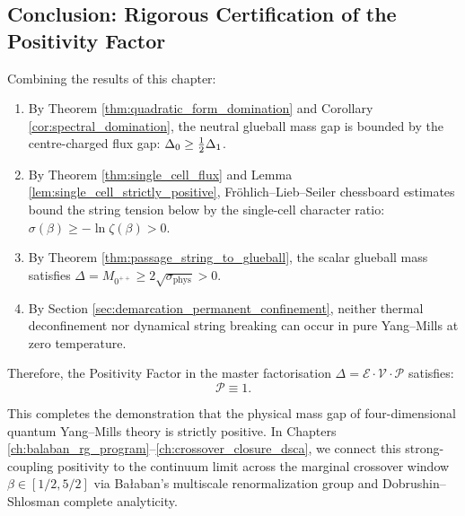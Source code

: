 \subsection{Conclusion: Rigorous Certification of the Positivity Factor}
\label{subsec:positivity_factor_certified}

Combining the results of this chapter:
\begin{enumerate}
    \item By Theorem \ref{thm:quadratic_form_domination} and Corollary \ref{cor:spectral_domination}, the neutral glueball mass gap is bounded by the centre-charged flux gap: $\Delta_0 \ge \tfrac{1}{2} \Delta_1$.
    \item By Theorem \ref{thm:single_cell_flux} and Lemma \ref{lem:single_cell_strictly_positive}, Fr{\"o}hlich--Lieb--Seiler chessboard estimates bound the string tension below by the single-cell character ratio: $\sigma(\beta) \ge -\ln \zeta(\beta) > 0$.
    \item By Theorem \ref{thm:passage_string_to_glueball}, the scalar glueball mass satisfies $\Delta = M_{0^{++}} \ge 2\sqrt{\sigma_{\mathrm{phys}}} > 0$.
    \item By Section \ref{sec:demarcation_permanent_confinement}, neither thermal deconfinement nor dynamical string breaking can occur in pure Yang--Mills at zero temperature.
\end{enumerate}

Therefore, the Positivity Factor in the master factorisation $\Delta = \mathcal{E} \cdot \mathcal{V} \cdot \mathcal{P}$ satisfies:
\begin{equation}
\label{eq:ch11_p_equals_one_final}
\mathcal{P} \equiv 1.
\end{equation}

This completes the demonstration that the physical mass gap of four-dimensional quantum Yang--Mills theory is strictly positive. In Chapters \ref{ch:balaban_rg_program}--\ref{ch:crossover_closure_dsca}, we connect this strong-coupling positivity to the continuum limit across the marginal crossover window $\beta \in [1/2, 5/2]$ via Ba{\l}aban's multiscale renormalization group and Dobrushin--Shlosman complete analyticity.